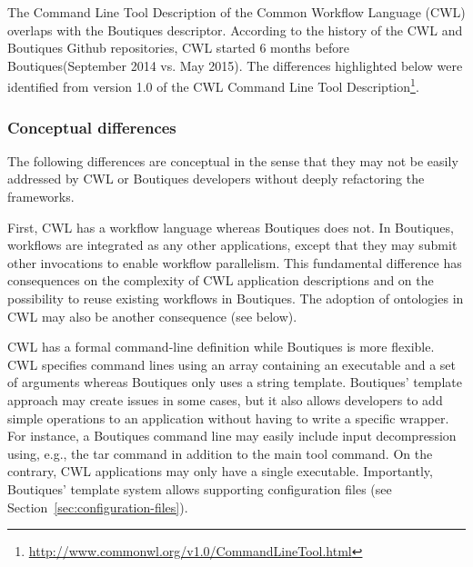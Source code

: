 \documentclass{article}
\newcommand{\boutiques}{Boutiques\xspace}
\begin{document}
The Command Line Tool Description of the Common Workflow Language
(CWL) overlaps with the \boutiques descriptor. According to the history
of the CWL and \boutiques Github repositories, CWL started 6 months
before \boutiques (September 2014 vs. May 2015). The differences
highlighted below were identified from version 1.0 of the CWL Command
Line Tool
Description\footnote{\url{http://www.commonwl.org/v1.0/CommandLineTool.html}}.

\subsubsection{Conceptual differences}

The following differences are conceptual in the sense that they may
not be easily addressed by CWL or \boutiques developers without deeply
refactoring the frameworks.

First, CWL has a workflow language whereas \boutiques does not. In
\boutiques, workflows are integrated as any other applications, except
that they may submit other invocations to enable workflow
parallelism. This fundamental difference has consequences on the
complexity of CWL application descriptions and on the possibility to
reuse existing workflows in \boutiques. The adoption of ontologies in
CWL may also be another consequence (see below).

CWL has a formal command-line definition while \boutiques is more
flexible. CWL specifies command lines using an array containing an
executable and a set of arguments whereas \boutiques only uses a
string template. \boutiques' template approach may create issues in
some cases, but it also allows developers to add simple operations to
an application without having to write a specific wrapper. For
instance, a \boutiques command line may easily include input
decompression using, e.g., the tar command in addition to the main
tool command. On the contrary, CWL applications may only have a single
executable. Importantly, \boutiques' template system allows supporting
configuration files (see Section~\ref{sec:configuration-files}).
\end{document}
